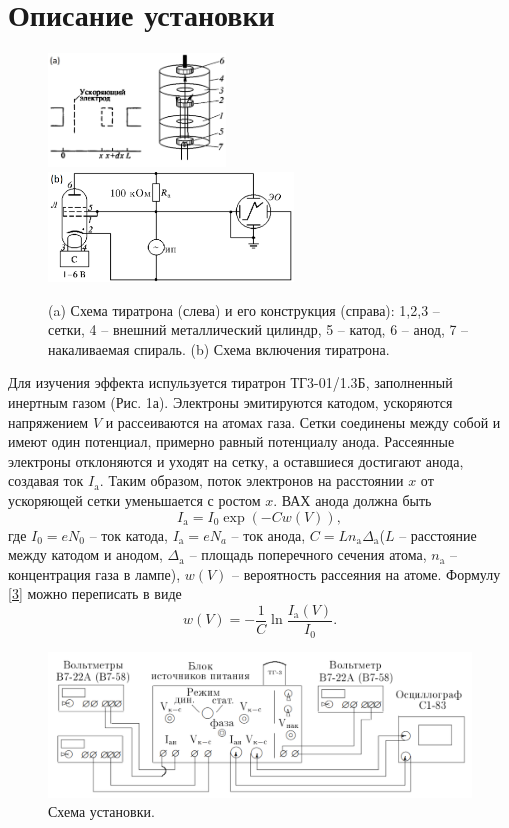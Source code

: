 \documentclass[a4paper,12pt]{article} %
\begin{document}
  \section{Описание установки}
    \begin{figure}[h]
      \includegraphics[width=0.42\textwidth]{img/2.png}
      \includegraphics[width=0.58\textwidth]{img/3.png}
      \centering
      \caption{(a) Схема тиратрона (слева) и его конструкция (справа): 1,2,3 -- сетки, 4 -- внешний металлический цилиндр, 5 -- катод, 6 -- анод, 7 -- накаливаемая спираль. (b) Схема включения тиратрона.}
    \end{figure}
    Для изучения эффекта испульзуется тиратрон ТГ3-01/1.3Б, заполненный инертным газом (Рис. 1а). 
    Электроны эмитируются катодом, ускоряются напряжением $V$ и рассеиваются на атомах газа. 
    Сетки соединены между собой и имеют один потенциал, примерно равный потенциалу анода. 
    Рассеянные электроны отклоняются и уходят на сетку, а оставшиеся достигают анода, создавая ток $I_\text{a}$. 
    Таким образом, поток электронов на расстоянии $x$ от ускоряющей сетки уменьшается с ростом $x$. ВАХ анода должна быть
    \begin{equation}\label{3}
      I_\text{a} = I_0 \exp\left( - C w(V) \right),
    \end{equation}
    где $I_0 = eN_0$ -- ток катода, $I_\text{a} = eN_a$ -- ток анода, $C = Ln_\text{a} \Delta_\text{a}$($L$ --  расстояние между катодом и анодом, $\Delta_\text{a}$ -- площадь поперечного сечения атома, $n_\text{a}$ -- концентрация газа в лампе), $w(V)$ -- вероятность рассеяния на атоме.
    Формулу \eqref{3} можно переписать в виде
    \[\tag{5a}\label{5a}
    w(V) = -\dfrac{1}{C}\ln \dfrac{I_\text{a}(V)}{I_0}.
    \]
    \begin{figure}[h]
      \includegraphics[scale=0.6]{img/1.png}
      \centering
      \caption{Схема установки.}
    \end{figure}\\
\end{document}
